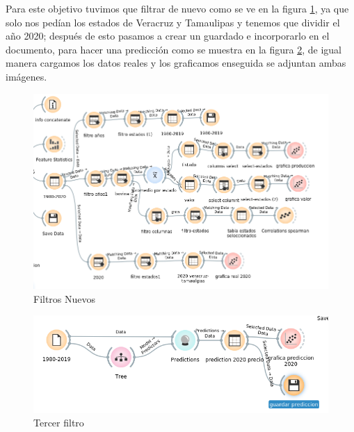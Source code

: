\item Para este objetivo tuvimos que filtrar de nuevo como se ve en la figura \ref{filtrosnuevos}, ya que solo nos pedían los estados de Veracruz y Tamaulipas y tenemos que dividir el año 2020; después de esto pasamos a crear un guardado e incorporarlo en el documento, para hacer una predicción como se muestra en la figura \ref{tercerfiltro}, de igual manera cargamos los datos reales y los graficamos enseguida se adjuntan ambas imágenes.
\begin{figure}[h]
    \centering
    \includegraphics[scale = 0.4]{imagenes/Orange2.png}
    \caption{Filtros Nuevos}
    \label{filtrosnuevos}
\end{figure}
\begin{figure}[h]
    \centering
    \includegraphics[scale = 0.5]{imagenes/orange3.png}
    \caption{Tercer filtro}
    \label{tercerfiltro}
\end{figure}
